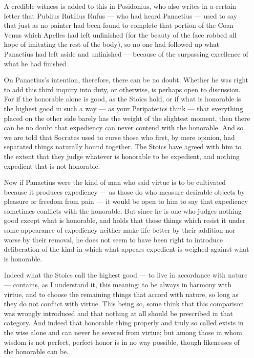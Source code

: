  A credible witness is added to this in Posidonius, who also writes in a certain letter that Publius Rutilius Rufus — who had heard Panaetius — used to say that just as no painter had been found to complete that portion of the Coan Venus which Apelles had left unfinished (for the beauty of the face robbed all hope of imitating the rest of the body), so no one had followed up what Panaetius had left aside and unfinished — because of the surpassing excellence of what he had finished.

 On Panaetius's intention, therefore, there can be no doubt. Whether he was right to add this third inquiry into duty, or otherwise, is perhaps open to discussion. For if the honorable alone is good, as the Stoics hold, or if what is honorable is the highest good in such a way — as your Peripatetics think — that everything placed on the other side barely has the weight of the slightest moment, then there can be no doubt that expediency can never contend with the honorable. And so we are told that Socrates used to curse those who first, by mere opinion, had separated things naturally bound together. The Stoics have agreed with him to the extent that they judge whatever is honorable to be expedient, and nothing expedient that is not honorable.

 Now if Panaetius were the kind of man who said virtue is to be cultivated because it produces expediency — as those do who measure desirable objects by pleasure or freedom from pain — it would be open to him to say that expediency sometimes conflicts with the honorable. But since he is one who judges nothing good except what is honorable, and holds that those things which resist it under some appearance of expediency neither make life better by their addition nor worse by their removal, he does not seem to have been right to introduce deliberation of the kind in which what appears expedient is weighed against what is honorable.

 Indeed what the Stoics call the highest good — to live in accordance with nature — contains, as I understand it, this meaning: to be always in harmony with virtue, and to choose the remaining things that accord with nature, so long as they do not conflict with virtue. This being so, some think that this comparison was wrongly introduced and that nothing at all should be prescribed in that category. And indeed that honorable thing properly and truly so called exists in the wise alone and can never be severed from virtue; but among those in whom wisdom is not perfect, perfect honor is in no way possible, though likenesses of the honorable can be.

